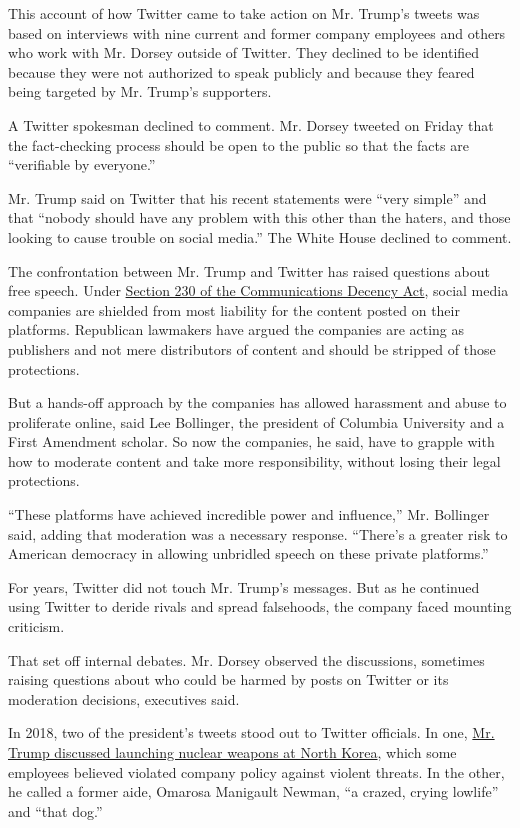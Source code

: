This account of how Twitter came to take action on Mr. Trump's tweets
was based on interviews with nine current and former company employees
and others who work with Mr. Dorsey outside of Twitter. They declined to
be identified because they were not authorized to speak publicly and
because they feared being targeted by Mr. Trump's supporters.

A Twitter spokesman declined to comment. Mr. Dorsey tweeted on Friday
that the fact-checking process should be open to the public so that the
facts are ``verifiable by everyone.''

Mr. Trump said on Twitter that his recent statements were ``very
simple'' and that ``nobody should have any problem with this other than
the haters, and those looking to cause trouble on social media.'' The
White House declined to comment.

The confrontation between Mr. Trump and Twitter has raised questions
about free speech. Under
\href{https://www.nytimes.com/2020/05/28/business/section-230-internet-speech.html}{Section
230 of the Communications Decency Act}, social media companies are
shielded from most liability for the content posted on their platforms.
Republican lawmakers have argued the companies are acting as publishers
and not mere distributors of content and should be stripped of those
protections.

But a hands-off approach by the companies has allowed harassment and
abuse to proliferate online, said Lee Bollinger, the president of
Columbia University and a First Amendment scholar. So now the companies,
he said, have to grapple with how to moderate content and take more
responsibility, without losing their legal protections.

``These platforms have achieved incredible power and influence,'' Mr.
Bollinger said, adding that moderation was a necessary response.
``There's a greater risk to American democracy in allowing unbridled
speech on these private platforms.''

For years, Twitter did not touch Mr. Trump's messages. But as he
continued using Twitter to deride rivals and spread falsehoods, the
company faced mounting criticism.

That set off internal debates. Mr. Dorsey observed the discussions,
sometimes raising questions about who could be harmed by posts on
Twitter or its moderation decisions, executives said.

In 2018, two of the president's tweets stood out to Twitter officials.
In one,
\href{https://twitter.com/realdonaldtrump/status/948355557022420992?lang=en}{Mr.
Trump discussed launching nuclear weapons at North Korea}, which some
employees believed violated company policy against violent threats. In
the other, he called a former aide, Omarosa Manigault Newman, ``a
crazed, crying lowlife'' and ``that dog.''

